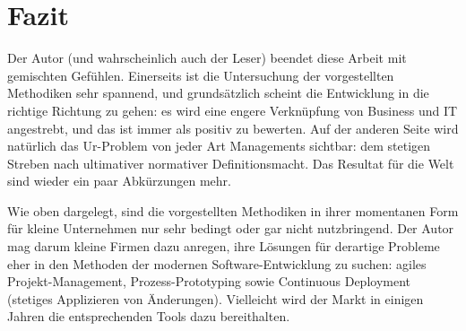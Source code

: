 \documentclass[11pt,listof=totoc]{scrreprt} %
\theoremstyle{definition}
\begin{document}
\section{Fazit}

Der Autor (und wahrscheinlich auch der Leser) beendet diese Arbeit mit gemischten Gefühlen. Einerseits ist die Untersuchung der vorgestellten Methodiken sehr spannend, und grundsätzlich scheint die Entwicklung in die richtige Richtung zu gehen: es wird eine engere Verknüpfung von Business und IT angestrebt, und das ist immer als positiv zu bewerten. Auf der anderen Seite wird natürlich das Ur-Problem von jeder Art Managements sichtbar: dem stetigen Streben nach ultimativer normativer Definitionsmacht. Das Resultat für die Welt sind wieder ein paar Abkürzungen mehr.

Wie oben dargelegt, sind die vorgestellten Methodiken in ihrer momentanen Form für kleine Unternehmen nur sehr bedingt oder gar nicht nutzbringend. Der Autor mag darum kleine Firmen dazu anregen, ihre Lösungen für derartige Probleme eher in den Methoden der modernen Software-Entwicklung zu suchen: agiles Projekt-Management, Prozess-Prototyping sowie Continuous Deployment (stetiges Applizieren von Änderungen). Vielleicht wird der Markt in einigen Jahren die entsprechenden Tools dazu bereithalten.

\listoffigures



\end{document}

